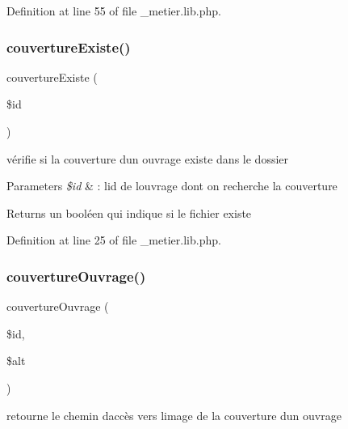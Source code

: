 Definition at line 55 of file \+\_\+metier.\+lib.\+php.

\mbox{\label{__metier_8lib_8php_a1ae47f5153d633ef97c13d9bcd3c7687}} 
\subsubsection{\texorpdfstring{couverture\+Existe()}{couvertureExiste()}}
{\footnotesize\ttfamily couverture\+Existe (\begin{DoxyParamCaption}\item[{}]{\$id }\end{DoxyParamCaption})}

vérifie si la couverture d\textquotesingle{}un ouvrage existe dans le dossier


\begin{DoxyParams}{Parameters}
{\em \$id} & \+: l\textquotesingle{}id de l\textquotesingle{}ouvrage dont on recherche la couverture \\
\hline
\end{DoxyParams}
\begin{DoxyReturn}{Returns}
un booléen qui indique si le fichier existe 
\end{DoxyReturn}


Definition at line 25 of file \+\_\+metier.\+lib.\+php.

\mbox{\label{__metier_8lib_8php_a3aa5a8c105a4074b3fd6fc6847665432}} 
\subsubsection{\texorpdfstring{couverture\+Ouvrage()}{couvertureOuvrage()}}
{\footnotesize\ttfamily couverture\+Ouvrage (\begin{DoxyParamCaption}\item[{}]{\$id,  }\item[{}]{\$alt }\end{DoxyParamCaption})}

retourne le chemin d\textquotesingle{}accès vers l\textquotesingle{}image de la couverture d\textquotesingle{}un ouvrage


